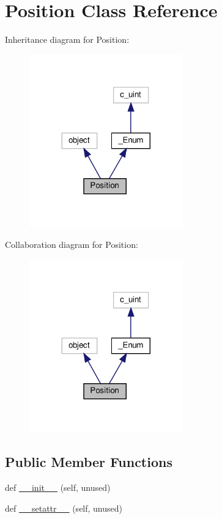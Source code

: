 \hypertarget{classvlc_1_1_position}{}\section{Position Class Reference}
\label{classvlc_1_1_position}


Inheritance diagram for Position\+:
\nopagebreak
\begin{figure}[H]
\begin{center}
\leavevmode
\includegraphics[width=188pt]{classvlc_1_1_position__inherit__graph}
\end{center}
\end{figure}


Collaboration diagram for Position\+:
\nopagebreak
\begin{figure}[H]
\begin{center}
\leavevmode
\includegraphics[width=188pt]{classvlc_1_1_position__coll__graph}
\end{center}
\end{figure}
\subsection*{Public Member Functions}
\begin{DoxyCompactItemize}
\item 
def \hyperlink{classvlc_1_1_position_a2bb95ceade0d4388fafdeabfe906b5fa}{\+\_\+\+\_\+init\+\_\+\+\_\+} (self, unused)
\item 
def \hyperlink{classvlc_1_1_position_ac71d81dd3f2d993325779566c783ba0c}{\+\_\+\+\_\+setattr\+\_\+\+\_\+} (self, unused)
\end{DoxyCompactItemize}
